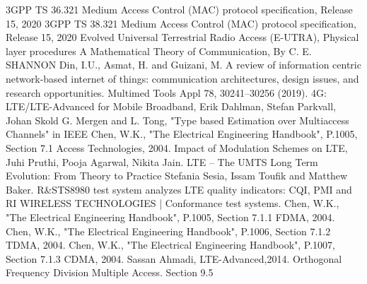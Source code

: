 \begin{thebibliography}{9}
3GPP TS 36.321 Medium Access Control (MAC) protocol specification, Release 15, 2020
3GPP TS 38.321 Medium Access Control (MAC) protocol specification, Release 15, 2020
Evolved Universal Terrestrial Radio Access (E-UTRA), Physical layer procedures 
A Mathematical Theory of Communication, By C. E. SHANNON
Din, I.U., Asmat, H. and Guizani, M. A review of information centric network-based internet of things: communication architectures, design issues, and research opportunities. Multimed Tools Appl 78, 30241–30256 (2019). 
4G: LTE/LTE-Advanced for Mobile Broadband, Erik Dahlman, Stefan Parkvall, Johan Skold
G. Mergen and L. Tong, "Type based Estimation over Multiaccess Channels" in IEEE 
Chen, W.K., "The Electrical Engineering Handbook", P.1005, Section 7.1 Access Technologies, 2004.
Impact of Modulation Schemes on LTE, Juhi Pruthi, Pooja Agarwal, Nikita Jain.
LTE – The UMTS Long Term Evolution: From Theory to Practice Stefania Sesia, Issam Toufik and Matthew Baker.
R\&STS8980 test system analyzes LTE quality indicators: CQI, PMI and RI
WIRELESS TECHNOLOGIES | Conformance test systems. 
Chen, W.K., "The Electrical Engineering Handbook", P.1005, Section 7.1.1 FDMA, 2004. 
Chen, W.K., "The Electrical Engineering Handbook", P.1006, Section 7.1.2 TDMA, 2004.
Chen, W.K., "The Electrical Engineering Handbook", P.1007, Section 7.1.3 CDMA, 2004.
Sassan Ahmadi, LTE-Advanced,2014. Orthogonal Frequency Division Multiple Access. Section 9.5
\end{thebibliography}
